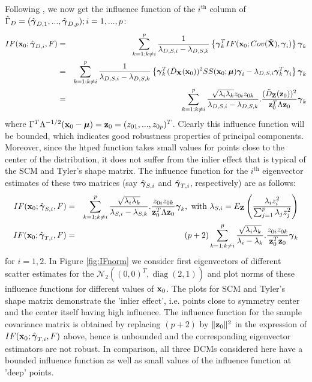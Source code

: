 \documentclass[fleqn,11pt]{article}
\DeclareMathOperator*{\diag}{diag}
\begin{document}
Following \cite{croux00}, we now get the influence function of the $i^\text{th}$ column of $\hat\Gamma_D = (\hat{{\boldsymbol{\gamma}}}_{D,1},...,\hat{{\boldsymbol{\gamma}}}_{D,p}); i = 1,...,p$:
%
\begin{eqnarray}
IF({\bf{x}}_0; \hat{{\boldsymbol{\gamma}}}_{D,i}, F) &=& \sum_{k=1; k \neq i}^p \frac{1}{\lambda_{D,S,i} - \lambda_{D,S,k}} \left\{ {\boldsymbol{\gamma}}^T_k IF({\bf{x}}_0; Cov(\tilde {{\mathbf{X}}}), {\boldsymbol{\gamma}}_i) \right\} {\boldsymbol{\gamma}}_k \notag \\
&=& \sum_{k=1; k \neq i}^p \frac{1}{\lambda_{D,S,i} - \lambda_{D,S,k}} \left\{ {\boldsymbol{\gamma}}^T_k (\tilde D_{\mathbf{X}}({\bf{x}}_0))^2 SS({\bf{x}}_0; {\boldsymbol{\mu}}){\boldsymbol{\gamma}}_i - \lambda_{D,S,i}{\boldsymbol{\gamma}}_k^T{\boldsymbol{\gamma}}_i \right\} {\boldsymbol{\gamma}}_k \notag \\
&=& \sum_{k=1; k \neq i}^p \frac{\sqrt{\lambda_i \lambda_k} z_{0i} z_{0k}}{\lambda_{D,S,i} - \lambda_{D,S,k}}. \frac{(\tilde D_{\mathbf{Z}}({\bf{z}}_0))^2 }{{\bf{z}}_0^T \Lambda {\bf{z}}_0} {\boldsymbol{\gamma}}_k
\end{eqnarray}
%
where $\Gamma^T \Lambda^{-1/2} ({\bf{x}}_0 - {\boldsymbol{\mu}}) = {\bf{z}}_0 = (z_{01},...,z_{0p})^T$. Clearly this influence function will be bounded, which indicates good robustness properties of principal components. Moreover, since the htped function takes small values for points close to the center of the distribution, it does not suffer from the inlier effect that is typical of the SCM and Tyler's shape matrix. The influence function for the $i^\text{th}$ eigenvector estimates of these two matrices (say $\hat{{\boldsymbol{\gamma}}}_{S,i}$ and $\hat{{\boldsymbol{\gamma}}}_{T,i}$, respectively) are as follows:
%
\begin{eqnarray*}
\quad IF({\bf{x}}_0; \hat {{\boldsymbol{\gamma}}}_{S,i}, F) &=& \sum_{k=1; k \neq i}^p \frac{\sqrt{\lambda_i \lambda_k}}{\lambda_{S,i} - \lambda_{S,k}}. \frac{z_{0i} z_{0k}}{{\bf{z}}_0^T \Lambda {\bf{z}}_0} {\boldsymbol{\gamma}}_k, \text{ with } \lambda_{S,i} = E_{\mathbf{Z}} \left( \frac{\lambda_i z_i^2}{\sum_{j=1}^p \lambda_j z_j^2} \right) \quad \\
IF({\bf{x}}_0; \hat {{\boldsymbol{\gamma}}}_{T,i}, F) &=& (p+2) \sum_{k=1; k \neq i}^p \frac{\sqrt{\lambda_i \lambda_k}}{\lambda_i - \lambda_k}. \frac{z_{0i} z_{0k}}{{\bf{z}}_0^T {\bf{z}}_0} {\boldsymbol{\gamma}}_k \quad 
\end{eqnarray*}
%
for $i = 1,2$. In Figure \ref{fig:IFnorm} we consider first eigenvectors of different scatter estimates for the $\mathcal{N}_2((0,0)^T, \diag(2,1))$ and plot norms of these influence functions for different values of ${\bf{x}}_0$. The plots for SCM and Tyler's shape matrix demonstrate the 'inlier effect', i.e. points close to symmetry center and the center itself having high influence. The influence function for the sample covariance matrix is obtained by replacing $(p+2)$ by $\| {\bf{z}}_0 \|^2$ in the expression of $IF({\bf{x}}_0; \hat {{\boldsymbol{\gamma}}}_{T,i}, F)$ above, hence is unbounded and the corresponding eigenvector estimators are not robust. In comparison, all three DCMs considered here have a bounded influence function as well as small values of the influence function at 'deep' points.
\end{document}
